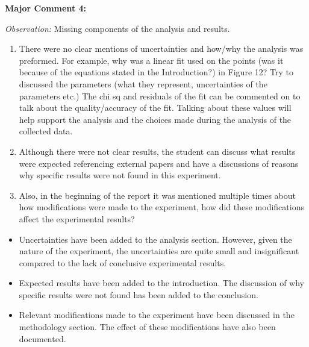 \documentclass[%
 aip,
cp,  %
 amsmath,amssymb,
 reprint,%
]{revtex4-2}
\begin{document}
        \begin{mdframed} \textbf{Major Comment 4:}

            \textit{Observation:} Missing components of the analysis and results.

            \begin{enumerate}
                \item There were no clear mentions of uncertainties and how/why the analysis was preformed. For example, why was a linear fit used on the points (was it because of the equations stated in the Introduction?) in Figure 12? Try to discussed the parameters (what they represent, uncertainties of the parameters etc.) The chi sq and residuals of the fit can be commented on to talk about the quality/accuracy of the fit. Talking about these values will help support the analysis and the choices made during the analysis of the collected data.
                \item Although there were not clear results, the student can discuss what results were expected referencing external papers and have a discussions of reasons why specific results were not found in this experiment.
                \item Also, in the beginning of the report it was mentioned multiple times about how modifications were made to the experiment, how did these modifications affect the experimental results?
            \end{enumerate}
        \end{mdframed}
        {\color{red}
        
        \begin{itemize}
            \item Uncertainties have been added to the analysis section. However, given the nature of the experiment, the uncertainties are quite small and insignificant compared to the lack of conclusive experimental results.
            \item Expected results have been added to the introduction. The discussion of why specific results were not found has been added to the conclusion.
            \item Relevant modifications made to the experiment have been discussed in the methodology section. The effect of these modifications have also been documented.
        \end{itemize}

        }
\end{document}
